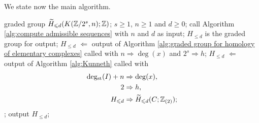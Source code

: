 We state now the main algorithm.

\begin{alg}
\begin{algorithmic}[1]
\ENSURE graded group $\widetilde{H}_{\leqslant d}(K(\mathbb{Z}/2^s,n);\mathbb{Z})$;
\REQUIRE $s\geq1$, $n\geq1$ and $d\geq0$;
\STATE call Algorithm \ref{alg:compute admissible sequences} with $n$ and $d$ as input;
\STATE $H_{\leq d}$ is the graded group for output;
\STATE $H_{\leq d}$ $\Leftarrow$ output of Algorithm \ref{alg:graded group for homology of elementary complexes} called with $n\Rightarrow\deg(x)$ and $2^s\Rightarrow h$;
\STATE $H_{\leq d}$ $\Leftarrow$ output of Algorithm \ref{alg:Kunneth} called with 
\begin{align*}
\operatorname{deg_{st}}(I)+n &\Rightarrow \deg(x),\\
2 &\Rightarrow h, \\
H_{\leqslant d} &\Rightarrow \widetilde{H}_{\leqslant d}(C;\mathbb{Z}_{(2)});
\end{align*}
\ENDFOR;
\STATE output $H_{\leq d}$;
\end{algorithmic}
\end{alg}

\endinput